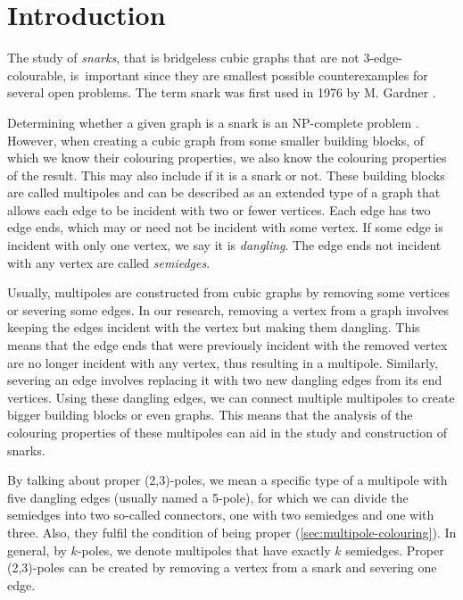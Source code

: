 \section*{Introduction}


The study of \textit{snarks}, that is bridgeless cubic graphs that are not 3-edge-colourable, is~important since they are smallest possible counterexamples for several open problems. The term snark was first used in 1976 by M. Gardner \cite{Gardner1976}.

Determining whether a given graph is a snark is an NP-complete problem \cite{HolyerNP}. However, when creating a cubic graph from some smaller building blocks, of which we know their colouring properties, we also know the colouring properties of the result. This may also include if it is a snark or not. These building blocks are called multipoles and can be described as an extended type of a graph that allows each edge to be incident with two or fewer vertices. Each edge has two edge ends, which may or need not be incident with some vertex. If some edge is incident with only one vertex, we say it is \textit{dangling}. The edge ends not incident with any vertex are called \textit{semiedges}.

Usually, multipoles are constructed from cubic graphs by removing some vertices or severing some edges. In our research, removing a vertex from a graph involves keeping the edges incident with the vertex but making them dangling. This means that the edge ends that were previously incident with the removed vertex are no longer incident with any vertex, thus resulting in a multipole. Similarly, severing an edge involves replacing it with two new dangling edges from its end vertices. Using these dangling edges, we can connect multiple multipoles to create bigger building blocks or even graphs. This means that the analysis of the colouring properties of these multipoles can aid in the study and construction of snarks.

By talking about proper (2,3)-poles, we mean a specific type of a multipole with five dangling edges (usually named a 5-pole), for which we can divide the semiedges into two so-called connectors, one with two semiedges and one with three. Also, they fulfil the condition of being proper (\cref{sec:multipole-colouring}). In general, by $k$-poles, we denote multipoles that have exactly $k$ semiedges. Proper (2,3)-poles can be created by removing a vertex from a snark and severing one edge.

